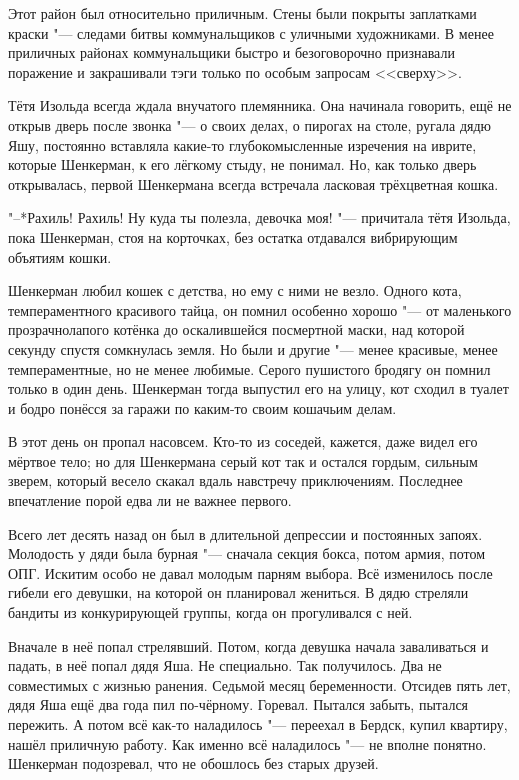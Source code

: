 \asterism

\textspace

\label{Fri_2012_07_20}

Этот район был относительно приличным.
Стены были покрыты заплатками краски "--- следами битвы коммунальщиков с уличными художниками.
В менее приличных районах коммунальщики быстро и безоговорочно признавали поражение и закрашивали тэги только по особым запросам <<сверху>>.

Тётя Изольда всегда ждала внучатого племянника.
Она начинала говорить, ещё не открыв дверь после звонка "--- о своих делах, о пирогах на столе, ругала дядю Яшу, постоянно вставляла какие-то глубокомысленные изречения на иврите, которые Шенкерман, к его лёгкому стыду, не понимал.
Но, как только дверь открывалась, первой Шенкермана всегда встречала ласковая трёхцветная кошка.

"--*Рахиль!
Рахиль!
Ну куда ты полезла, девочка моя! "--- причитала тётя Изольда, пока Шенкерман, стоя на корточках, без остатка отдавался вибрирующим объятиям кошки.

Шенкерман любил кошек с детства, но ему с ними не везло.
Одного кота, темпераментного красивого тайца, он помнил особенно хорошо "--- от маленького прозрачнолапого котёнка до оскалившейся посмертной маски, над которой секунду спустя сомкнулась земля.
Но были и другие "--- менее красивые, менее темпераментные, но не менее любимые.
Серого пушистого бродягу он помнил только в один день.
Шенкерман тогда выпустил его на улицу, кот сходил в туалет и бодро понёсся за гаражи по каким-то своим кошачьим делам.

В этот день он пропал насовсем.
Кто-то из соседей, кажется, даже видел его мёртвое тело;
но для Шенкермана серый кот так и остался гордым, сильным зверем, который весело скакал вдаль навстречу приключениям.
Последнее впечатление порой едва ли не важнее первого.

\asterism

Всего лет десять назад он был в длительной депрессии и постоянных запоях.
Молодость у дяди была бурная "--- сначала секция бокса, потом армия, потом ОПГ.
Искитим особо не давал молодым парням выбора.
Всё изменилось после гибели его девушки, на которой он планировал жениться.
В дядю стреляли бандиты из конкурирующей группы, когда он прогуливался с ней.

Вначале в неё попал стрелявший.
Потом, когда девушка начала заваливаться и падать, в неё попал дядя Яша.
Не специально.
Так получилось.
Два не совместимых с жизнью ранения.
Седьмой месяц беременности.
Отсидев пять лет, дядя Яша ещё два года пил по-чёрному.
Горевал.
Пытался забыть, пытался пережить.
А потом всё как-то наладилось "--- переехал в Бердск, купил квартиру, нашёл приличную работу.
Как именно всё наладилось "--- не вполне понятно.
Шенкерман подозревал, что не обошлось без старых друзей.

